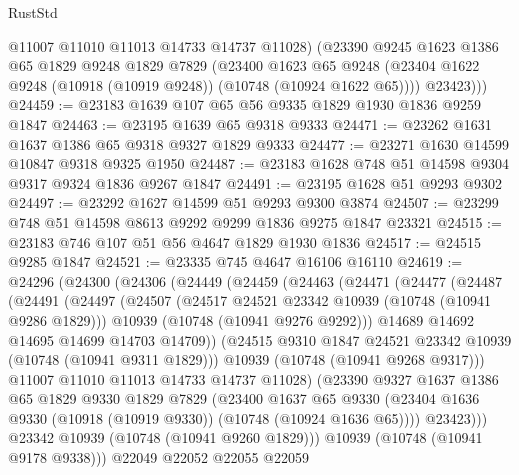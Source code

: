 \begin{lexlean}{RustStd}
\begin{coremodule}
{\begin{coremodule}
{{{{{          @11007
          @11010
          @11013
          @14733
          @14737
          @11028)
        (@23390
          @9245
          @1623
          @1386
          @65
          @1829
          @9248
          @1829
          @7829
          (@23400
            @1623
            @65
            @9248
            (@23404 @1622 @9248 (@10918 (@10919 @9248)) (@10748 (@10924 @1622 @65))))
          @23423)))
@24459 := @23183 @1639 @107 @65 @56 @9335 @1829 @1930 @1836 @9259 @1847
@24463 := @23195 @1639 @65 @9318 @9333
@24471 := @23262 @1631 @1637 @1386 @65 @9318 @9327 @1829 @9333
@24477 := @23271 @1630 @14599 @10847 @9318 @9325 @1950
@24487 := @23183 @1628 @748 @51 @14598 @9304 @9317 @9324 @1836 @9267 @1847
@24491 := @23195 @1628 @51 @9293 @9302
@24497 := @23292 @1627 @14599 @51 @9293 @9300 @3874
@24507 := @23299 @748 @51 @14598 @8613 @9292 @9299 @1836 @9275 @1847 @23321
@24515 := @23183 @746 @107 @51 @56 @4647 @1829 @1930 @1836
@24517 := @24515 @9285 @1847
@24521 := @23335 @745 @4647 @16106 @16110
@24619 := @24296
    (@24300
      (@24306
        (@24449
          (@24459
            (@24463
              (@24471
                (@24477
                  (@24487
                    (@24491
                      (@24497
                        (@24507
                          (@24517 @24521 @23342 @10939 (@10748 (@10941 @9286 @1829)))
                          @10939
                          (@10748 (@10941 @9276 @9292)))
                        @14689
                        @14692
                        @14695
                        @14699
                        @14703
                        @14709))
                    (@24515 @9310 @1847 @24521 @23342 @10939 (@10748 (@10941 @9311 @1829)))
                    @10939
                    (@10748 (@10941 @9268 @9317)))
                  @11007
                  @11010
                  @11013
                  @14733
                  @14737
                  @11028)
                (@23390
                  @9327
                  @1637
                  @1386
                  @65
                  @1829
                  @9330
                  @1829
                  @7829
                  (@23400
                    @1637
                    @65
                    @9330
                    (@23404 @1636 @9330 (@10918 (@10919 @9330)) (@10748 (@10924 @1636 @65))))
                  @23423)))
            @23342
            @10939
            (@10748 (@10941 @9260 @1829)))
          @10939
          (@10748 (@10941 @9178 @9338)))
        @22049
        @22052
        @22055
        @22059
}}}}}
\end{coremodule}}
\end{coremodule}
\end{lexlean}

